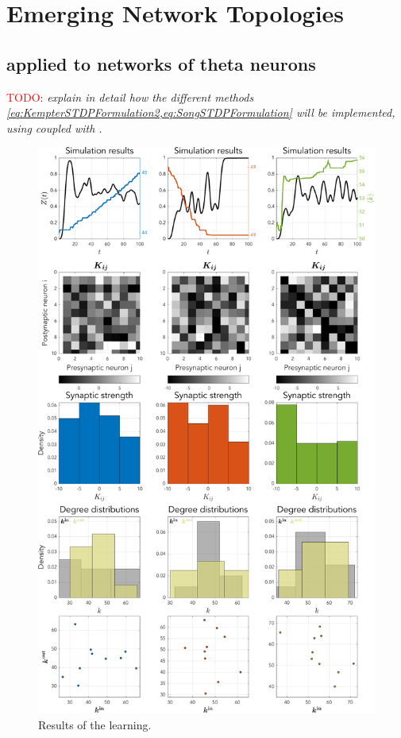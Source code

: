 \newpage
\section{\mywork Emerging Network Topologies}
\subsection{\STDP applied to networks of theta neurons}
\textcolor{red}{TODO}: \textsl{explain in detail how the different methods \cref{eq:KempterSTDPFormulation2,eq:SongSTDPFormulation} will be implemented, using \STDP coupled with \IP.}

\begin{figure}[H]
\centering
\includegraphics[height = \textheight]{../Figures/Learning/STDP.pdf}
\caption{Results of the \STDP learning.}
\label{fig:STDP}
\end{figure}

